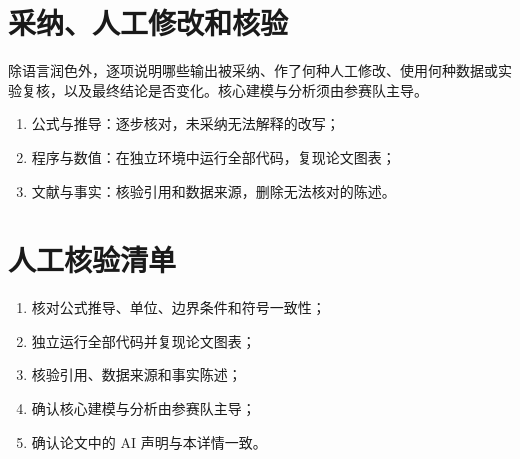 \documentclass[a4paper,12pt,fontset=fandol]{ctexart}
\begin{document}
\section{采纳、人工修改和核验}

除语言润色外，逐项说明哪些输出被采纳、作了何种人工修改、使用何种数据或实验复核，以及最终结论是否变化。核心建模与分析须由参赛队主导。

\begin{enumerate}
  \item 公式与推导：逐步核对，未采纳无法解释的改写；
  \item 程序与数值：在独立环境中运行全部代码，复现论文图表；
  \item 文献与事实：核验引用和数据来源，删除无法核对的陈述。
\end{enumerate}

\section{人工核验清单}

\begin{enumerate}
  \item 核对公式推导、单位、边界条件和符号一致性；
  \item 独立运行全部代码并复现论文图表；
  \item 核验引用、数据来源和事实陈述；
  \item 确认核心建模与分析由参赛队主导；
  \item 确认论文中的 AI 声明与本详情一致。
\end{enumerate}
\end{document}
